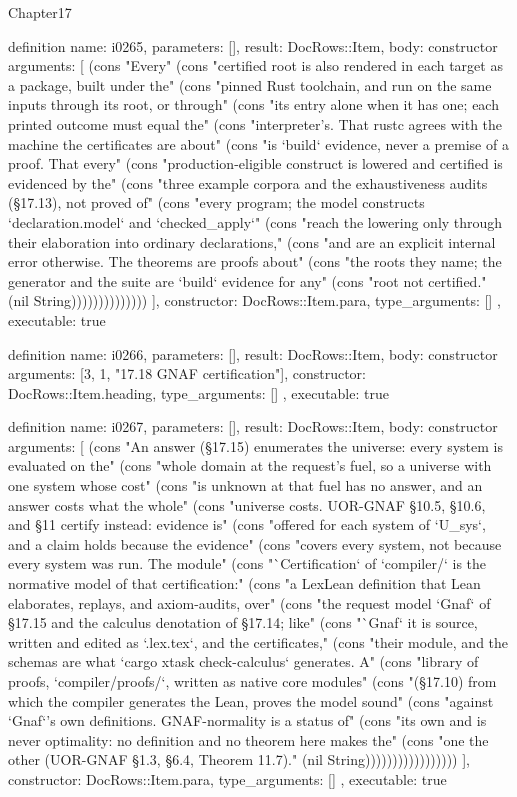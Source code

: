 \begin{lexlean}{Chapter17}
\begin{semanticmodule}
definition{
  name: i0265,
  parameters: [],
  result: DocRows::Item,
  body: constructor{
    arguments: [
      (cons "Every" (cons "certified root is also rendered in each target as a package, built under the" (cons "pinned Rust toolchain, and run on the same inputs through its root, or through" (cons "its entry alone when it has one; each printed outcome must equal the" (cons "interpreter's. That rustc agrees with the machine the certificates are about" (cons "is `build` evidence, never a premise of a proof. That every" (cons "production-eligible construct is lowered and certified is evidenced by the" (cons "three example corpora and the exhaustiveness audits (§17.13), not proved of" (cons "every program; the model constructs `declaration.model` and `checked_apply`" (cons "reach the lowering only through their elaboration into ordinary declarations," (cons "and are an explicit internal error otherwise. The theorems are proofs about" (cons "the roots they name; the generator and the suite are `build` evidence for any" (cons "root not certified." (nil String))))))))))))))
    ],
    constructor: DocRows::Item.para,
    type_arguments: []
  },
  executable: true
}

definition{
  name: i0266,
  parameters: [],
  result: DocRows::Item,
  body: constructor{
    arguments: [3, 1, "17.18 GNAF certification"],
    constructor: DocRows::Item.heading,
    type_arguments: []
  },
  executable: true
}

definition{
  name: i0267,
  parameters: [],
  result: DocRows::Item,
  body: constructor{
    arguments: [
      (cons "An answer (§17.15) enumerates the universe: every system is evaluated on the" (cons "whole domain at the request's fuel, so a universe with one system whose cost" (cons "is unknown at that fuel has no answer, and an answer costs what the whole" (cons "universe costs. UOR-GNAF §10.5, §10.6, and §11 certify instead: evidence is" (cons "offered for each system of `U_sys`, and a claim holds because the evidence" (cons "covers every system, not because every system was run. The module" (cons "`Certification` of `compiler/` is the normative model of that certification:" (cons "a LexLean definition that Lean elaborates, replays, and axiom-audits, over" (cons "the request model `Gnaf` of §17.15 and the calculus denotation of §17.14; like" (cons "`Gnaf` it is source, written and edited as `.lex.tex`, and the certificates," (cons "their module, and the schemas are what `cargo xtask check-calculus` generates. A" (cons "library of proofs, `compiler/proofs/`, written as native core modules" (cons "(§17.10) from which the compiler generates the Lean, proves the model sound" (cons "against `Gnaf`'s own definitions. GNAF-normality is a status of" (cons "its own and is never optimality: no definition and no theorem here makes the" (cons "one the other (UOR-GNAF §1.3, §6.4, Theorem 11.7)." (nil String)))))))))))))))))
    ],
    constructor: DocRows::Item.para,
    type_arguments: []
  },
  executable: true
}


\end{semanticmodule}
\end{lexlean}
